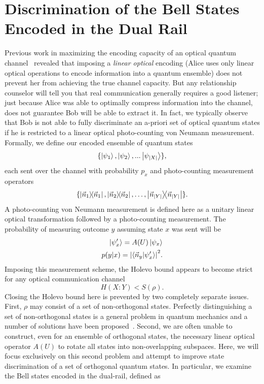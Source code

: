 \documentclass[aps,pra,twocolumn,showpacs,superscriptaddress,floatfix,10pt]{revtex4}
\begin{document}
\section{Discrimination of the Bell States Encoded in the Dual Rail}
Previous work in maximizing the encoding capacity of an optical quantum channel~\cite{First Paper} revealed that imposing a \textit{linear optical} encoding (Alice uses only linear optical operations to encode information into a quantum ensemble) does not prevent her from achieving the true channel capacity. But any relationship counselor will tell you that real communication generally requires a good listener; just because Alice was able to optimally compress information into the channel, does not guarantee Bob will be able to extract it. In fact, we typically observe that Bob is not able to fully discriminate an a-priori set of optical quantum states if he is restricted to a linear optical photo-counting von Neumann measurement. Formally, we define our encoded ensemble of quantum states
\begin{equation}
\{\ket{\psi_1},\ket{\psi_2},...\ket{\psi_{\abs{X}}}\},
\end{equation}  
each sent over the channel with probability $p_x$
and photo-counting measurement operators
\begin{equation}
\{ \outerproduct{\vec{n}_1}{\vec{n}_1}, \outerproduct{\vec{n}_2}{\vec{n}_2}, \dots , \outerproduct{\vec{n}_{\abs{Y}}}{\vec{n}_{\abs{Y}} } \}.
\end{equation}
A photo-counting von Neumann measurement is defined here as a unitary linear optical transformation followed by a photo-counting measurement. The probability of measuring outcome $y$ assuming state $x$ was sent will be
\begin{eqnarray}
\label{von Neumann conditional probability part 1}
\ket{\psi_x^\prime} = A(U) \ket{\psi_x} \\
\label{von Neumann conditional probability part 2}
p(y|x) = \abs{\braket{\vec{n}_y}{\psi_x^\prime}}^2.
\end{eqnarray}
Imposing this measurement scheme, the Holevo bound appears to become strict for any optical communication channel
\begin{equation}
	H(X:Y) < S(\rho).
\end{equation}
Closing the Holevo bound here is prevented by two completely separate issues. First, $\rho$ may consist of a set of non-orthogonal states. Perfectly distinguishing a set of non-orthogonal states is a general problem in quantum mechanics and a number of solutions have been proposed~\cite{Hausladen,Lloyd,Lloyd Other,Ogawa,Nagaoka,Hayashi}. Second, we are often unable to construct, even for an ensemble of orthogonal states, the necessary linear optical operator $A(U)$ to rotate all states into  non-overlapping subspaces. Here, we will focus exclusively on this second problem and attempt to improve state discrimination of a set of orthogonal quantum states. In particular, we examine the Bell states encoded in the dual-rail, defined as
\end{document}
